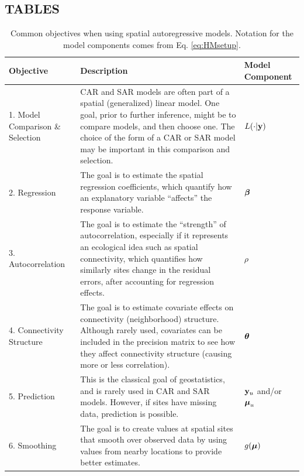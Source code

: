 \documentclass[11pt, titlepage]{article}\usepackage[]{graphicx}\usepackage[]{color}
\begin{document}
\begin{spacing}{1.9}
\begin{flushleft}
\newpage


\section*{TABLES}
\begin{table}[ht]
	\caption{Common objectives when using spatial autoregressive models. Notation for the model components comes from Eq. \ref{eq:HMsetup}. \label{Tab:ARobj}}
\begin{center}
{\footnotesize
\begin{tabular}{|p{1.1in}|p{3.7in}|p{0.8in}|}
	\hline
	Objective & Description & Model Component \\
	\hline
	\hline
	1. Model Comparison \& Selection & CAR and SAR models are often part of a spatial (generalized) linear model. One goal, prior to further inference, might be to compare models, and then choose one. The choice of the form of a CAR or SAR model may be important in this comparison and selection. & $L(\cdot|\mathbf{y})$ \\
  \hline
	2. Regression & The goal is to estimate the spatial regression coefficients, which quantify how an explanatory variable ``affects'' the response variable.  & ${\boldsymbol{\beta}}$ \\
	\hline
	3. Autocorrelation & The goal is to estimate the ``strength'' of autocorrelation, especially if it represents an ecological idea such as spatial connectivity, which quantifies how similarly sites change in the residual errors, after accounting for regression effects.  & $\rho$ \\
	\hline
	4. Connectivity Structure & The goal is to estimate covariate effects on connectivity (neighborhood) structure. Although rarely used, covariates can be included in the precision matrix to see how they affect connectivity structure (causing more or less correlation). & $\mbox{\boldmath $\theta$}$ \\
	\hline
	5. Prediction & This is the classical goal of geostatistics, and is rarely used in CAR and SAR models. However, if sites have missing data, prediction is possible.  & $\mathbf{y}_u$ and/or $\mbox{\boldmath $\mu$}_u$ \\
	\hline
	6. Smoothing  & The goal is to create values at spatial sites that smooth over observed data by using values from nearby locations to provide better estimates. & $g(\mbox{\boldmath $\mu$})$ \\
	\hline
\end{tabular}
}
\end{center}
\end{table}


\end{flushleft}
\end{spacing}
\end{document}
